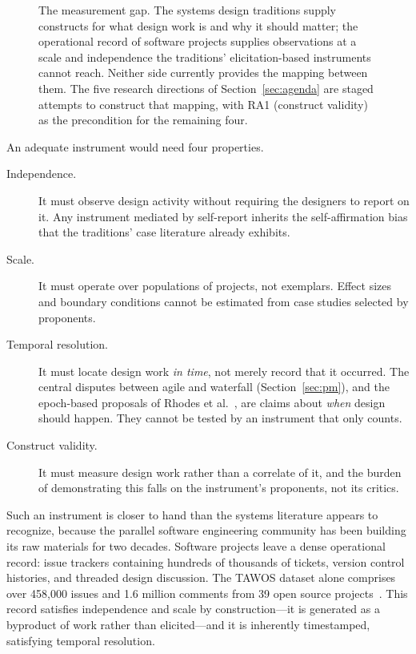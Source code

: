 \documentclass[11pt,a4paper]{article}
\begin{document}
\begin{figure}[htbp]
\caption{The measurement gap. The systems design traditions supply constructs
for what design work is and why it should matter; the operational record of
software projects supplies observations at a scale and independence the
traditions' elicitation-based instruments cannot reach. Neither side currently
provides the mapping between them. The five research directions of
Section~\ref{sec:agenda} are staged attempts to construct that mapping, with
RA1 (construct validity) as the precondition for the remaining four.}
\label{fig:gap}
\end{figure}

An adequate instrument would need four properties.

\begin{description}
\item[Independence.] It must observe design activity without requiring the
designers to report on it. Any instrument mediated by self-report inherits the
self-affirmation bias that the traditions' case literature already exhibits.

\item[Scale.] It must operate over populations of projects, not exemplars.
Effect sizes and boundary conditions cannot be estimated from case studies
selected by proponents.

\item[Temporal resolution.] It must locate design work \emph{in time}, not
merely record that it occurred. The central disputes between agile and waterfall
(Section~\ref{sec:pm}), and the epoch-based proposals of Rhodes et
al.~\citep{rhodes2009}, are claims about \emph{when} design should happen. They
cannot be tested by an instrument that only counts.

\item[Construct validity.] It must measure design work rather than a correlate
of it, and the burden of demonstrating this falls on the instrument's
proponents, not its critics.
\end{description}

Such an instrument is closer to hand than the systems literature appears to
recognize, because the parallel software engineering community has been building
its raw materials for two decades. Software projects leave a dense operational
record: issue trackers containing hundreds of thousands of tickets, version
control histories, and threaded design discussion. The TAWOS dataset alone
comprises over 458{,}000 issues and 1.6 million comments from 39 open source
projects~\citep{tawosi2022}. This record satisfies independence and scale by
construction---it is generated as a byproduct of work rather than elicited---and
it is inherently timestamped, satisfying temporal resolution.
\end{document}
